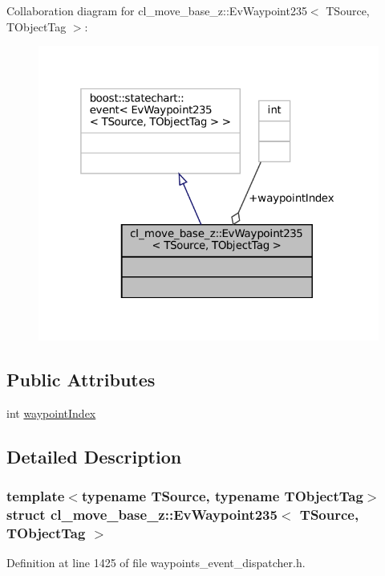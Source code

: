Collaboration diagram for cl\+\_\+move\+\_\+base\+\_\+z\+:\+:Ev\+Waypoint235$<$ T\+Source, T\+Object\+Tag $>$\+:
\nopagebreak
\begin{figure}[H]
\begin{center}
\leavevmode
\includegraphics[width=319pt]{structcl__move__base__z_1_1EvWaypoint235__coll__graph}
\end{center}
\end{figure}
\subsection*{Public Attributes}
\begin{DoxyCompactItemize}
\item 
int \hyperlink{structcl__move__base__z_1_1EvWaypoint235_af88a99e13031db650841c5a5a51501c0}{waypoint\+Index}
\end{DoxyCompactItemize}


\subsection{Detailed Description}
\subsubsection*{template$<$typename T\+Source, typename T\+Object\+Tag$>$\newline
struct cl\+\_\+move\+\_\+base\+\_\+z\+::\+Ev\+Waypoint235$<$ T\+Source, T\+Object\+Tag $>$}



Definition at line 1425 of file waypoints\+\_\+event\+\_\+dispatcher.\+h.



